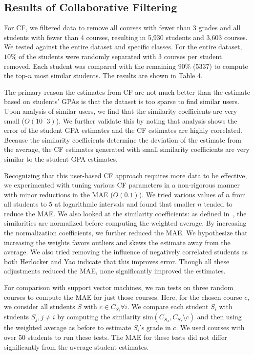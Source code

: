 \subsection{Results of Collaborative Filtering}

For CF, we filtered data to remove all courses with fewer than 3 grades and all students with fewer than 4 courses, resulting in 5,930 students and 3,603 courses.  We tested against the entire dataset and specific classes.  For the entire dataset, $10\%$ of the students were randomly separated with 3 courses per student removed.  Each student was compared with the remaining $90\%$ (5337) to compute the top-$n$ most similar students. The results are shown in Table 4.

The primary reason the estimates from CF are not much better than the estimate based on students' GPAs is that the dataset is too sparse to find similar users.  Upon analysis of similar users, we find that the similarity coefficients are very small ($O(10^-3)$).  We further validate this by noting that analysis shows the error of the student GPA estimates and the CF estimates are highly correlated.  Because the similarity coefficients determine the deviation of the estimate from the average, the CF estimates generated with small similarity coefficients are very similar to the student GPA estimates.

Recognizing that this user-based CF approach requires more data to be effective, we experimented with tuning various CF parameters in a non-rigorous manner with minor reductions in the MAE ($O(0.1)$).  We tried various values of $n$ from all students to $5$ at logarithmic intervals and found that smaller $n$ tended to reduce the MAE.  We also looked at the similarity coefficients: as defined in~\cite{breese}, the similarities are normalized before computing the weighted average.  By increasing the normalization coefficients, we further reduced the MAE.  We hypothesize that increasing the weights favors outliers and skews the estimate away from the average.  We also tried removing the influence of negatively correlated students as both Herlocker and Yao indicate that this improves error.  Though all these adjustments reduced the MAE, none significantly improved the estimates. 

For comparison with support vector machines, we ran tests on three random courses to compute the MAE for just those courses.  Here, for the chosen course $c$, we consider all students $S$ with $c \in C_{S_i} \forall i$.  We compare each student $S_i$ with students $S_j, j \neq i$ by computing the similarity $\textrm{sim}(C_{S_J}, C_{S_I} \setminus c)$ and then using the weighted average as before to estimate $S_i$'s grade in $c$.  We used courses with over 50 students to run these tests.  The MAE for these tests did not differ significantly from the average student estimates.

